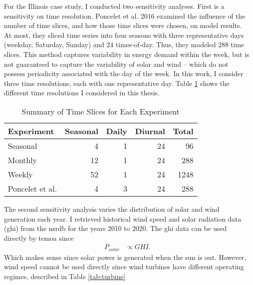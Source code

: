 For the Illinois case study, I conducted two sensitivity analyses. First is a
sensitivity on time resolution. Poncelet et al. 2016 examined the influence of
the number of time slices, and how those time slices were chosen, on model results.
At most, they sliced time series into four seasons with three representative days (weekday,
Saturday, Sunday) and 24 times-of-day. Thus, they modeled 288 time slices. This
method captures variability in energy demand within the week, but is not guaranteed
to capture the variability of solar and wind -- which do not possess periodicity
associated with the day of the week. In this work, I consider three time resolutions,
each with one representative day. Table \ref{tab:time-slice} shows the different
time resolutions I considered in this thesis.

\begin{table}[H]
  \centering
  \caption{Summary of Time Slices for Each Experiment}
  \label{tab:time-slice}
  \begin{tabular}{lrrrr}
    \toprule
    Experiment & Seasonal & Daily & Diurnal & Total\\
    \midrule
    Seasonal & 4 & 1 & 24 & 96\\
    Monthly & 12 & 1 & 24 & 288\\
    Weekly & 52 & 1 & 24 & 1248\\
    \midrule
    Poncelet et al. \cite{poncelet_impact_2016} & 4 & 3 &  24 & 288\\
    \bottomrule
  \end{tabular}
\end{table}

The second sensitivity analysis varies the distribution of solar and wind generation
each year. I retrieved historical wind speed and solar radiation data (\gls{ghi})
from the \gls{nsrdb} \cite{sengupta_national_2018} for the years 2010 to 2020.
The \gls{ghi} data can be used directly by \gls{temoa} since
\begin{align}
  P_{solar} &\propto GHI.
\end{align}
Which makes sense since solar power is generated when the sun is out. However,
wind speed cannot be used directly since wind turbines have different operating
regimes, described in Table \ref{tab:turbine}

\begin{table}[H]
  \centering
  \caption{Summary of Wind Turbine Data}
  \label{tab:turbine}

\end{table}

